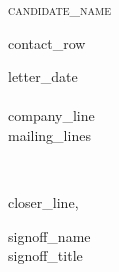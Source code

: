 \documentclass[12pt]{letter}
\begin{document}
\AddToShipoutPictureBG{%
\color{gr}
\AtPageUpperLeft{\rule[-1.3in]{\paperwidth}{1.3in}}
}

\begin{center}
{\fontsize{28}{0}\selectfont\scshape {{candidate_name}}}

{{contact_row}}
\end{center}

\vspace{0.2in}

{{letter_date}}\\

\\
{{company_line}}\\
{{mailing_lines}}

\\

\vspace{-0.1in}\setlength\parindent{24pt}

\vspace{0.1in}
\vfill

\begin{flushright}
{{closer_line}},

\vspace{0.15in}
{{signoff_name}}\\
{{signoff_title}}
\end{flushright}
\end{document}
